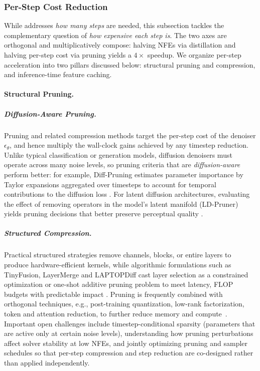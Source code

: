 \subsubsection{Per-Step Cost Reduction}
\label{subsec:efficiency}

{While  addresses \emph{how many steps} are needed, this subsection tackles the complementary question of \emph{how expensive each step is}. The two axes are orthogonal and multiplicatively compose: halving NFEs via distillation and halving per-step cost via pruning yields a $4\times$ speedup. We organize per-step acceleration into two pillars discussed below: structural pruning and compression, and inference-time feature caching.}

\paragraph{Structural Pruning.}
\label{subsubsec:pruning}

\subparagraph{Diffusion-Aware Pruning.}
Pruning and related compression methods target the per-step cost of the denoiser $\epsilon_\theta$, and hence multiply the wall-clock gains achieved by any timestep reduction. Unlike typical classification or generation models, diffusion denoisers must operate across many noise levels, so pruning criteria that are \emph{diffusion-aware} perform better: for example, Diff-Pruning estimates parameter importance by Taylor expansions aggregated over timesteps to account for temporal contributions to the diffusion loss \citep{fang2023structural}. For latent diffusion architectures, evaluating the effect of removing operators in the model's latent manifold (LD-Pruner) yields pruning decisions that better preserve perceptual quality \citep{castells2024ld}.

\subparagraph{Structured Compression.}
Practical structured strategies remove channels, blocks, or entire layers to produce hardware-efficient kernels, while algorithmic formulations such as TinyFusion, LayerMerge and LAPTOPDiff cast layer selection as a constrained optimization or one-shot additive pruning problem to meet latency, FLOP budgets with predictable impact \citep{fang2025tinyfusion, kim2024layermerge,zhang2024laptop}. Pruning is frequently combined with orthogonal techniques, e.g., post-training quantization, low-rank factorization, token and attention reduction, to further reduce memory and compute~\citep{10377259,shang2023post,kim2025ditto,bolya2023tomesd,kim2024tofu,yuan2024ditfastattn}. Important open challenges include timestep-conditional sparsity (parameters that are active only at certain noise levels), understanding how pruning perturbations affect solver stability at low NFEs, and jointly optimizing pruning and sampler schedules so that per-step compression and step reduction are co-designed rather than applied independently.

